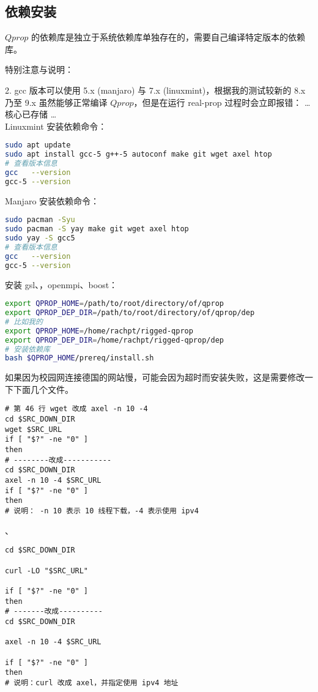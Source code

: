 \subsection{依赖安装}
$Qprop$ 的依赖库是独立于系统依赖库单独存在的，需要自己编译特定版本的依赖库。

特别注意与说明：

2. gcc 版本可以使用 5.x (manjaro) 与 7.x (linuxmint)，根据我的测试较新的 8.x 乃至 9.x 虽然能够正常编译 $Qprop$，但是在运行 real-prop 过程时会立即报错： \ldots 核心已存储 \ldots \\
Linuxmint 安装依赖命令：
\begin{lstlisting}[language=bash]
sudo apt update
sudo apt install gcc-5 g++-5 autoconf make git wget axel htop
# 查看版本信息
gcc   --version
gcc-5 --version
\end{lstlisting}
Manjaro 安装依赖命令：
\begin{lstlisting}[language=bash]
sudo pacman -Syu
sudo pacman -S yay make git wget axel htop
sudo yay -S gcc5
# 查看版本信息
gcc   --version
gcc-5 --version
\end{lstlisting}

安装 gsl、，openmpi、boost：
\begin{lstlisting}[language=bash]
export QPROP_HOME=/path/to/root/directory/of/qprop
export QPROP_DEP_DIR=/path/to/root/directory/of/qprop/dep
# 比如我的
export QPROP_HOME=/home/rachpt/rigged-qprop
export QPROP_DEP_DIR=/home/rachpt/rigged-qprop/dep
# 安装依赖库
bash $QPROP_HOME/prereq/install.sh
\end{lstlisting}

如果因为校园网连接德国的网站慢，可能会因为超时而安装失败，这是需要修改一下下面几个文件。\\
\begin{lstlisting}
# 第 46 行 wget 改成 axel -n 10 -4 
cd $SRC_DOWN_DIR
wget $SRC_URL
if [ "$?" -ne "0" ]
then
# --------改成-----------
cd $SRC_DOWN_DIR
axel -n 10 -4 $SRC_URL
if [ "$?" -ne "0" ]
then
# 说明： -n 10 表示 10 线程下载，-4 表示使用 ipv4
\end{lstlisting}
、
\begin{lstlisting}
cd $SRC_DOWN_DIR

curl -LO "$SRC_URL"

if [ "$?" -ne "0" ]
then
# -------改成----------
cd $SRC_DOWN_DIR

axel -n 10 -4 $SRC_URL

if [ "$?" -ne "0" ]
then
# 说明：curl 改成 axel，并指定使用 ipv4 地址
\end{lstlisting}


